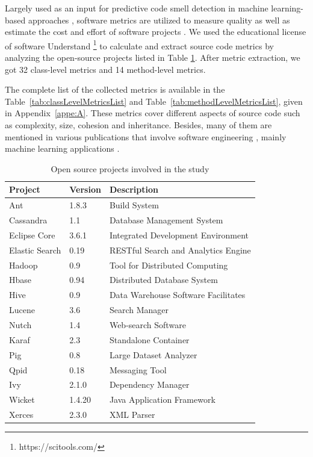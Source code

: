 Largely used as an input for predictive code smell detection in machine learning-based approaches \cite{fontana2016comparing, palomba2018detecting, hozano2017, fontana2013code, azeem2019machine}, software metrics are utilized to measure quality as well as estimate the cost and effort of software projects \cite{fenton2014software}. We used the educational license of software Understand \footnote{https://scitools.com/} to calculate and extract source code metrics by analyzing the open-source projects listed in Table \ref{tbl:openSourceProjects}. After metric extraction, we got 32 class-level metrics and 14 method-level metrics. 

The complete list of the collected metrics is available in the 
Table~\ref{tab:classLevelMetricsList} and Table~\ref{tab:methodLevelMetricsList}, given in Appendix~\ref{appe:A}. These metrics cover different aspects of source code such as complexity, size, cohesion and inheritance. Besides, many of them are mentioned in various publications that involve software engineering \cite{nunez2017source}, mainly machine learning applications \cite{azeem2019machine}.

\begin{table}[t]
\centering
\addtolength{\extrarowheight}{\belowrulesep}
\setlength{\aboverulesep}{0pt}
\setlength{\belowrulesep}{0pt}
\caption{Open source projects involved in the study}
\label{tbl:openSourceProjects}
\begin{tabular}{lll}
\toprule
\rowcolor[rgb]{0.753,0.753,0.753}  \textbf{Project} &   \textbf{Version}    & \textbf{Description}\\ 
\toprule
Ant & 1.8.3 & Build System  \\
Cassandra & 1.1 & Database Management System  \\
Eclipse Core & 3.6.1 & Integrated Development Environment  \\
Elastic Search & 0.19 & RESTful Search and Analytics Engine  \\
Hadoop & 0.9 & Tool for Distributed Computing  \\
Hbase & 0.94 & Distributed Database System  \\
Hive & 0.9 & Data Warehouse Software Facilitates  \\
Lucene & 3.6 & Search Manager  \\
Nutch & 1.4 & Web-search Software  \\
Karaf & 2.3 & Standalone Container  \\
Pig & 0.8 & Large Dataset Analyzer  \\
Qpid & 0.18 & Messaging Tool  \\
Ivy & 2.1.0 & Dependency Manager  \\
Wicket & 1.4.20 & Java Application Framework  \\
Xerces & 2.3.0 & XML Parser  \\
\bottomrule
\end{tabular}
\end{table}

